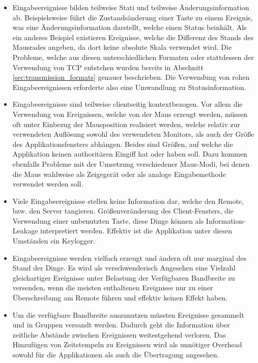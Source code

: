\begin{itemize}
\item Eingabeereignisse bilden teilweise Stati und teilweise Änderungsinformation ab. Beispielsweise führt die Zustandsänderung einer Taste zu einem Ereignis, was eine Änderungsinformation darstellt, welche einen Status beinhält. Als ein anderes Beispiel existieren Ereignisse, welche die Differenz des Stands des Mausrades angeben, da dort keine absolute Skala verwendet wird. Die Probleme, welche aus diesen unterschiedlichen Formaten oder stattdessen der Verwendung von TCP entstehen wurden bereits in Abschnitt \ref{sec:transmission_formats} genauer beschrieben. Die Verwendung von rohen Eingabeereignissen erforderte also eine Umwandlung zu Statusinformation.
\item Eingabeereignisse sind teilweise clientseitig kontextbezogen. Vor allem die Verwendung von Ereignissen, welche von der Maus erzeugt werden, müssen oft unter Einbezug der Mausposition realisiert werden, welche relativ zur verwendeten Auflösung sowohl des verwendeten Monitors, als auch der Größe des Applikationsfensters abhängen. Beides sind Größen, auf welche die Applikation keinen authoritären Eingiff hat oder haben soll. Dazu kommen ebenfalls Probleme mit der Umsetzung verschiedener Maus-Modi, bei denen die Maus wahlweise als Zeigegerät oder als analoge Eingabemethode verwendet werden soll.
\item Viele Eingabeereignisse stellen keine Information dar, welche den Remote, bzw. den Server tangieren. Größenveränderung des Client-Fensters, die Verwendung einer unbenutzten Taste, diese Dinge können als Information-Leakage interpretiert werden. Effektiv ist die Applikation unter diesen Umständen ein Keylogger.
\item Eingabeereignisse werden vielfach erzeugt und ändern oft nur marginal des Stand der Dinge. Es wird als verschwenderisch Angesehen eine Vielzahl gleichartiger Ereignisse unter Belastung der Verfügbaren Bandbreite zu versenden, wenn die meisten enthaltenen Ereignisse nur zu einer Überschreibung am Remote führen und effektiv keinen Effekt haben.
\item Um die verfügbare Bandbreite auszunutzen müssten Ereignisse gesammelt und in Gruppen versandt werden. Dadurch geht die Information über zeitliche Abstände zwischen Ereignissen weitestgehend verloren. Das Hinzufügen von Zeitstempeln zu Ereignissen wird als unnötiger Overhead sowohl für die Applikationen als auch die Übertragung angesehen.
\end{itemize}

